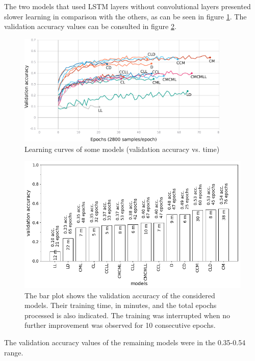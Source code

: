 The two models that used LSTM layers without convolutional layers presented slower learning in comparison with the others, as can be seen in figure \ref{fig:learning}. The validation accuracy values can be consulted in figure \ref{fig:models}.

\noindent
\begin{figure}[htb!]
\centering\includegraphics[width=0.9\textwidth]{content/epoch_val_categorical_accuracy.png}
\caption{\label{fig:learning}Learning curves of some models (validation accuracy vs. time)}%
\end{figure}

\noindent
\begin{figure}[htb!]
\centering\includegraphics[width=1.0\textwidth]{content/models.png}
\caption{\label{fig:models}The bar plot shows the validation accuracy of the considered models. Their training time, in minutes, and the total epochs processed is also indicated. The training was interrupted when no further improvement was observed for 10 consecutive epochs.}%
\end{figure}


The validation accuracy values of the remaining models were in the 0.35-0.54 range.


